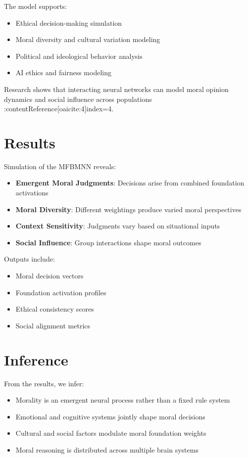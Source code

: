 \documentclass[12pt]{article}
\begin{document}
The model supports:

\begin{itemize}
\item Ethical decision-making simulation
\item Moral diversity and cultural variation modeling
\item Political and ideological behavior analysis
\item AI ethics and fairness modeling
\end{itemize}

Research shows that interacting neural networks can model moral opinion dynamics and social influence across populations :contentReference[oaicite:4]{index=4}.

\section{Results}

Simulation of the MFBMNN reveals:

\begin{itemize}
\item \textbf{Emergent Moral Judgments}: Decisions arise from combined foundation activations
\item \textbf{Moral Diversity}: Different weightings produce varied moral perspectives
\item \textbf{Context Sensitivity}: Judgments vary based on situational inputs
\item \textbf{Social Influence}: Group interactions shape moral outcomes
\end{itemize}

Outputs include:

\begin{itemize}
\item Moral decision vectors
\item Foundation activation profiles
\item Ethical consistency scores
\item Social alignment metrics
\end{itemize}

\section{Inference}

From the results, we infer:

\begin{itemize}
\item Morality is an emergent neural process rather than a fixed rule system
\item Emotional and cognitive systems jointly shape moral decisions
\item Cultural and social factors modulate moral foundation weights
\item Moral reasoning is distributed across multiple brain systems
\end{itemize}
\end{document}
